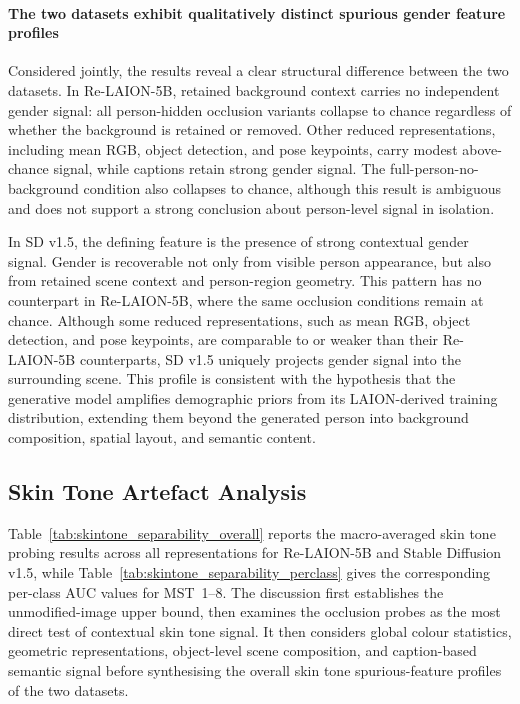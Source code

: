 \paragraph{The two datasets exhibit qualitatively distinct spurious gender feature profiles}

Considered jointly, the results reveal a clear structural difference between the two datasets. In Re-LAION-5B, retained background context carries no independent gender signal: all person-hidden occlusion variants collapse to chance regardless of whether the background is retained or removed. Other reduced representations, including mean RGB, object detection, and pose keypoints, carry modest above-chance signal, while captions retain strong gender signal. The full-person-no-background condition also collapses to chance, although this result is ambiguous and does not support a strong conclusion about person-level signal in isolation.

In SD v1.5, the defining feature is the presence of strong contextual gender signal. Gender is recoverable not only from visible person appearance, but also from retained scene context and person-region geometry. This pattern has no counterpart in Re-LAION-5B, where the same occlusion conditions remain at chance. Although some reduced representations, such as mean RGB, object detection, and pose keypoints, are comparable to or weaker than their Re-LAION-5B counterparts, SD v1.5 uniquely projects gender signal into the surrounding scene. This profile is consistent with the hypothesis that the generative model amplifies demographic priors from its LAION-derived training distribution, extending them beyond the generated person into background composition, spatial layout, and semantic content.


\subsection{Skin Tone Artefact Analysis}

Table~\ref{tab:skintone_separability_overall} reports the macro-averaged skin tone
probing results across all representations for Re-LAION-5B and Stable Diffusion v1.5,
while Table~\ref{tab:skintone_separability_perclass} gives the corresponding per-class
AUC values for MST~1--8. The discussion first establishes the unmodified-image upper
bound, then examines the occlusion probes as the most direct test of contextual skin tone
signal. It then considers global colour statistics, geometric representations,
object-level scene composition, and caption-based semantic signal before synthesising the
overall skin tone spurious-feature profiles of the two datasets.

